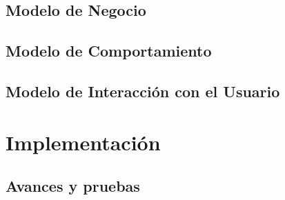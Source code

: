 \documentclass[12pt]{book}
\begin{document}
\chapter{Modelo de Negocio}\label{chp:modeloNegocios}
\newpage
{}

\chapter{Modelo de Comportamiento}

\chapter{Modelo de Interacción con el Usuario}


\part{Implementación}
\chapter{Avances y pruebas}\label{chp:avancesPruebas}







%    
\end{document}
